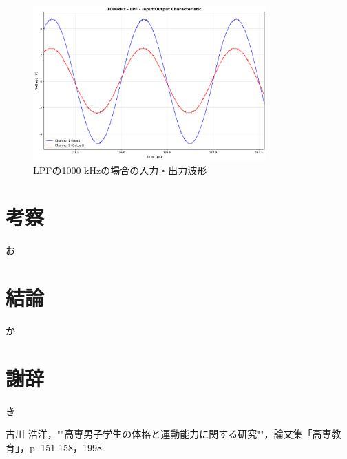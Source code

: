 \documentclass[11pt,dvipdfmx]{jarticle}
\begin{document}
\begin{figure}[H]
  \centering
  \includegraphics[width=0.8\textwidth]{graphs/1000kHz_LPF_characteristic.png}
  \caption{LPFの1000 kHzの場合の入力・出力波形}
  \label{fig:LPF_1000kHz}
\end{figure}








\section{考察}
お

\section{結論}
か

\section{謝辞}
き


\begin{thebibliography}{99}
 古川 浩洋，""高専男子学生の体格と運動能力に関する研究""，論文集「高専教育」，p. 151-158，1998.
\end{thebibliography}
\end{document}
